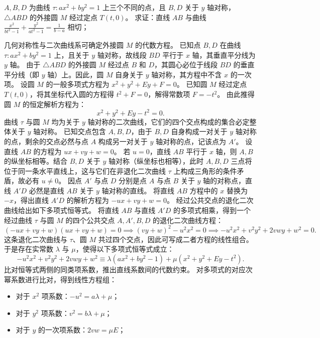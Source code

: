 \begin{example}
$A,B,D$ 为曲线 $\tau: ax^2 + by^2 = 1$ 上三个不同的点，且 $B,D$ 关于 $y$ 轴对称，$\triangle ABD$ 的外接圆 $M$ 经过定点 $T(t,0)$。
求证：直线 $AB$ 与曲线 $\frac{x^2}{bt^2 - 1} + \frac{y^2}{at^2 - 1} = \frac{1}{b - a}$ 相切；
\end{example}
\begin{solution}
几何对称性与二次曲线系可确定外接圆 $M$ 的代数方程。
已知点 $B, D$ 在曲线 $\tau: ax^2 + by^2 = 1$ 上，且关于 $y$ 轴对称，故线段 $BD$ 平行于 $x$ 轴，其垂直平分线为 $y$ 轴。
由于 $\triangle ABD$ 的外接圆 $M$ 经过点 $B$ 和 $D$，其圆心必位于线段 $BD$ 的垂直平分线（即 $y$ 轴）上。因此，圆 $M$ 自身关于 $y$ 轴对称，其方程中不含 $x$ 的一次项。
设圆 $M$ 的一般多项式方程为 $x^2 + y^2 + Ey + F = 0$。
已知圆 $M$ 经过定点 $T(t,0)$，将其坐标代入圆的方程得 $t^2 + F = 0$，解得常数项 $F = -t^2$。
由此推得圆 $M$ 的恒定解析方程为：
\[ x^2 + y^2 + Ey - t^2 = 0. \]
曲线 $\tau$ 与圆 $M$ 均为关于 $y$ 轴对称的二次曲线，它们的四个交点构成的集合必定整体关于 $y$ 轴对称。
已知交点包含 $A, B, D$，由于 $B, D$ 自身构成一对关于 $y$ 轴对称的点，剩余的交点必然与点 $A$ 构成另一对关于 $y$ 轴对称的点，记该点为 $A'$。
设直线 $AB$ 的方程为 $ux + vy + w = 0$。
若 $u = 0$，直线 $AB$ 平行于 $x$ 轴，则 $A, B$ 的纵坐标相等。结合 $B, D$ 关于 $y$ 轴对称（纵坐标也相等），此时 $A, B, D$ 三点将位于同一条水平直线上，这与它们在非退化二次曲线 $\tau$ 上构成三角形的条件矛盾，故必有 $u \neq 0$。
因点 $A'$ 与点 $D$ 分别是点 $A$ 与点 $B$ 关于 $y$ 轴的对称点，直线 $A'D$ 必然是直线 $AB$ 关于 $y$ 轴对称的直线。
将直线 $AB$ 方程中的 $x$ 替换为 $-x$，得出直线 $A'D$ 的解析方程为 $-ux + vy + w = 0$。
经过公共交点的退化二次曲线给出如下多项式恒等式。
将直线 $AB$ 与直线 $A'D$ 的多项式相乘，得到一个经过曲线 $\tau$ 与圆 $M$ 的四个公共交点 $A, A', B, D$ 的退化二次曲线方程：
\[ (-ux + vy + w)(ux + vy + w) = 0 \implies (vy + w)^2 - u^2 x^2 = 0 \implies -u^2 x^2 + v^2 y^2 + 2vwy + w^2 = 0. \]
这条退化二次曲线与 $\tau$、圆 $M$ 共过四个交点，因此可写成二者方程的线性组合。于是存在实常数 $\lambda$ 与 $\mu$，使得以下多项式恒等式成立：
\[ -u^2 x^2 + v^2 y^2 + 2vwy + w^2 \equiv \lambda(ax^2 + by^2 - 1) + \mu(x^2 + y^2 + Ey - t^2). \]
比对恒等式两侧的同类项系数，推出直线系数间的代数约束。
对多项式的对应次幂系数进行比对，得到线性方程组：
\begin{itemize}
\item 对于 $x^2$ 项系数：$-u^2 = a\lambda + \mu$；
\item 对于 $y^2$ 项系数：$v^2 = b\lambda + \mu$；
\item 对于 $y$ 的一次项系数：$2vw = \mu E$；

\end{itemize}
\end{solution}
